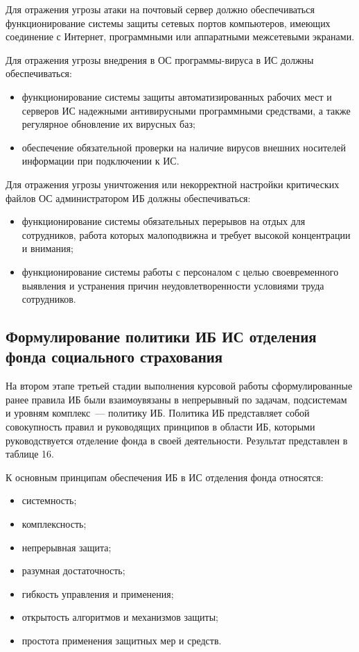\point Для отражения угрозы атаки на почтовый сервер должно
обеспечиваться функционирование системы защиты сетевых портов
компьютеров, имеющих соединение с Интернет, программными или
аппаратными межсетевыми экранами.

\point Для отражения угрозы внедрения в ОС программы-вируса в ИС
должны обеспечиваться:

\begin{itemize}
\item функционирование системы защиты автоматизированных рабочих мест
  и серверов ИС надежными антивирусными программными средствами, а
  также регулярное обновление их вирусных баз;
\item обеспечение обязательной проверки на наличие вирусов внешних
  носителей информации при подключении к ИС.
\end{itemize}

\point Для отражения угрозы уничтожения или некорректной настройки
критических файлов ОС администратором ИБ должны обеспечиваться:

\begin{itemize}
 \item функционирование системы обязательных перерывов на отдых для
   сотрудников, работа которых малоподвижна и требует высокой
   концентрации и внимания;
 \item функционирование системы работы с персоналом с целью
   своевременного выявления и устранения причин неудовлетворенности
   условиями труда сотрудников.
\end{itemize}

\subsection{Формулирование политики ИБ ИС отделения
  фонда социального страхования}

\point На втором этапе третьей стадии выполнения курсовой работы
сформулированные ранее правила ИБ были взаимоувязаны в непрерывный по
задачам, подсистемам и уровням комплекс~--- политику ИБ. Политика ИБ
представляет собой совокупность правил и руководящих принципов в
области ИБ, которыми руководствуется отделение фонда в своей
деятельности. Результат представлен в таблице 16.

\point К основным принципам обеспечения ИБ в ИС отделения фонда
относятся:

\begin{itemize}
\item системность;
\item комплексность;
\item непрерывная защита;
\item разумная достаточность;
\item гибкость управления и применения;
\item открытость алгоритмов и механизмов защиты;
\item простота применения защитных мер и средств.
\end{itemize}


